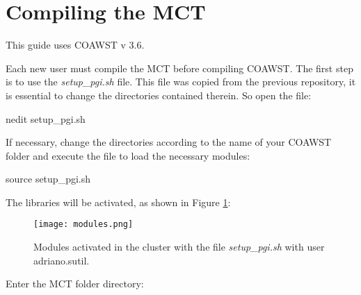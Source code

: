 \section{Compiling the MCT}
\bigskip

\begin{tcolorbox}[enhanced,
  grow to left by=0cm,%
  grow to right by=0cm,%
  enlarge top by=0cm,%
  enlarge bottom by=0cm,%
  tcbox raise base,
  boxrule=1.0pt,
  left=18mm,
  colframe=red!50!black,coltext=red!25!black,colback=red!10!white,
  overlay={\begin{tcbclipinterior}\fill[red!75!blue!50!white] (frame.south west)
    rectangle node[text=white,font=\sffamily\bfseries\footnotesize,rotate=0] {WARNING} ([xshift=18mm]frame.north west);\end{tcbclipinterior}}]
    This guide uses COAWST v 3.6.
\end{tcolorbox}
\bigskip


\noindent Each new user must compile the MCT before compiling COAWST. The first step is to use the \textit{setup\_pgi.sh} file. This file was copied from the previous 
repository, it is essential to change the directories contained therein. So open the file:
\bigskip

\begin{bashcode}
nedit setup_pgi.sh
\end{bashcode}
\bigskip

\noindent If necessary, change the directories according to the name of your COAWST folder and execute the file to load the necessary modules:
\bigskip

\begin{bashcode}
source setup_pgi.sh
\end{bashcode}
\bigskip

\noindent The libraries will be activated, as shown in Figure \textcolor{bleu_cite}{\ref{modulos}}:
\bigskip


\begin{figure}[H]
    \centering
    \texttt{[image: modules.png]}
    \caption{Modules activated in the cluster with the file \textit{setup\_pgi.sh} with user adriano.sutil.}
    \label{modulos}
\end{figure}
\bigskip

\noindent Enter the MCT folder directory:
\bigskip

